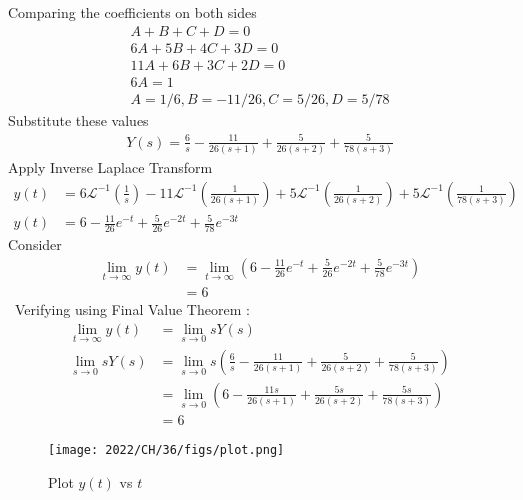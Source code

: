 \documentclass[journal,12pt,onecolumn]{IEEEtran}
\theoremstyle{remark}
\renewcommand{\brak}[1]{\left(#1\right)}
\begin{document}
Comparing the coefficients on both sides \\
\begin{align}
A + B + C + D = 0 \\
6A + 5B + 4C + 3D = 0 \\
11A + 6B + 3C + 2D = 0 \\
6A = 1 \\
A=1/6 ,B = -11/26 , C= 5/26 , D= 5/78 
\end{align}
Substitute these values 
\begin{align}
Y(s) = \frac{6}{s} - \frac{11}{26\brak{s+1}} + \frac{5}{26\brak{s+2}} + \frac{5}{78\brak{s+3}}
\end{align}
Apply Inverse Laplace Transform 
\begin{align}
y(t) &= 6\mathcal{L}^{-1}\brak{\frac{1}{s}} - 11\mathcal{L}^{-1}\brak{\frac{1}{26\brak{s+1}}} + 5\mathcal{L}^{-1}\brak{\frac{1}{26\brak{s+2}}} + 5\mathcal{L}^{-1}\brak{\frac{1}{78\brak{s+3}}} \\
y(t) &= 6 - \frac{11}{26}e^{-t} + \frac{5}{26}e^{-2t} +\frac{5}{78}e^{-3t}
\end{align}
Consider
\begin{align}
\lim_{t \to \infty} y(t) &= \lim_{t \to \infty} \brak{6 - \frac{11}{26}e^{-t} + \frac{5}{26}e^{-2t} +\frac{5}{78}e^{-3t}} \\
&= 6
\end{align}\
Verifying using Final Value Theorem :\\
\begin{align}
 \lim_{t \to \infty} y(t)   &= \lim_{s \to 0} sY(s)  \\
\lim_{s \to 0} sY(s) &= \lim_{s \to 0} s \brak{ \frac{6}{s} - \frac{11}{26\brak{s+1}} + \frac{5}{26\brak{s+2}} + \frac{5}{78\brak{s+3}}} \\
&= \lim_{s \to 0} \brak{ 6 - \frac{11s}{26\brak{s+1}} + \frac{5s}{26\brak{s+2}} + \frac{5s}{78\brak{s+3}}} \\
&= 6
\end{align}

\begin{figure}[h!]
\centering
\texttt{[image: 2022/CH/36/figs/plot.png]}
\caption{Plot $y(t)$ vs $t$ }
\end{figure}
\end{document}

